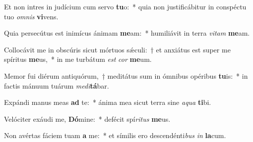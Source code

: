 \item Et non intres in judícium cum servo \textbf{tu}o:~* quia non justificábitur in conspéctu tuo \textit{om}\textit{nis} \textbf{vi}vens.
\item Quia persecútus est inimícus ánimam \textbf{me}am:~* humiliávit in terra \textit{vi}\textit{tam} \textbf{me}am.
\item Collocávit me in obscúris sicut mórtuos sǽculi:~† et anxiátus est super me spíritus \textbf{me}us,~* in me turbátum \textit{est} \textit{cor} \textbf{me}um.
\item Memor fui diérum antiquórum,~† meditátus sum in ómnibus opéribus \textbf{tu}is:~* in factis mánuum tuárum \textit{me}\textit{di}\textbf{tá}bar.
\item Expándi manus meas \textbf{ad} te:~* ánima mea sicut terra sine \textit{a}\textit{qua} \textbf{ti}bi.
\item Velóciter exáudi me, \textbf{Dó}mine:~* defécit spí\textit{ri}\textit{tus} \textbf{me}us.
\item Non avértas fáciem tuam \textbf{a} me:~* et símilis ero descendénti\textit{bus} \textit{in} \textbf{la}cum.
